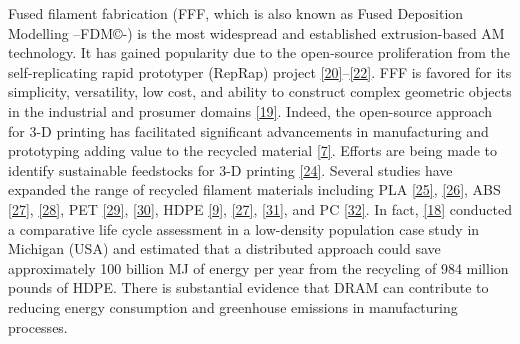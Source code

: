 \documentclass[
]{article}
\begin{document}
Fused filament fabrication (FFF, which is also known as Fused Deposition
Modelling --FDM©-) is the most widespread and established
extrusion-based AM technology. It has gained popularity due to the
open-source proliferation from the self-replicating rapid prototyper
(RepRap) project
\protect\hyperlink{ref-jones2011}{{[}20{]}}--\protect\hyperlink{ref-bowyer2014}{{[}22{]}}.
FFF is favored for its simplicity, versatility, low cost, and ability to
construct complex geometric objects in the industrial and prosumer
domains \protect\hyperlink{ref-romani2021}{{[}19{]}}. Indeed, the
open-source approach for 3-D printing has facilitated significant
advancements in manufacturing and prototyping adding value to the
recycled material \protect\hyperlink{ref-cruzsanchez2020}{{[}7{]}}.
Efforts are being made to identify sustainable feedstocks for 3-D
printing \protect\hyperlink{ref-Pakkanen2017}{{[}24{]}}. Several studies
have expanded the range of recycled filament materials including PLA
\protect\hyperlink{ref-cruzsanchez2017}{{[}25{]}},
\protect\hyperlink{ref-anderson2017}{{[}26{]}}, ABS
\protect\hyperlink{ref-mohammed2017a}{{[}27{]}},
\protect\hyperlink{ref-mohammed2017}{{[}28{]}}, PET
\protect\hyperlink{ref-zander2018}{{[}29{]}},
\protect\hyperlink{ref-vaucher2022}{{[}30{]}}, HDPE
\protect\hyperlink{ref-baechler2013}{{[}9{]}},
\protect\hyperlink{ref-mohammed2017a}{{[}27{]}},
\protect\hyperlink{ref-chong2017}{{[}31{]}}, and PC
\protect\hyperlink{ref-gaikwad2018}{{[}32{]}}. In fact,
\protect\hyperlink{ref-kreiger2014}{{[}18{]}} conducted a comparative
life cycle assessment in a low-density population case study in Michigan
(USA) and estimated that a distributed approach could save approximately
100 billion MJ of energy per year from the recycling of 984 million
pounds of HDPE. There is substantial evidence that DRAM can contribute
to reducing energy consumption and greenhouse emissions in manufacturing
processes.
\end{document}
